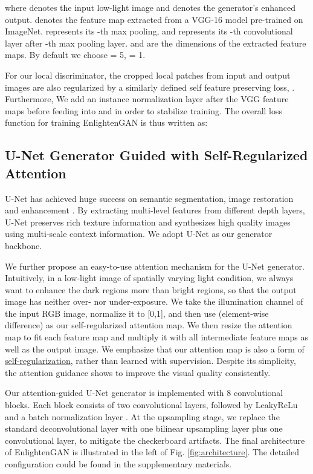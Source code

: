 \documentclass[journal]{IEEEtran}
\begin{document}
where  denotes the input low-light image and  denotes the generator's enhanced output.  denotes the feature map extracted from a VGG-16 model pre-trained on ImageNet.  represents its -th max pooling, and  represents its -th convolutional layer after -th max pooling layer.  and  are the dimensions of the extracted feature maps. By default we choose  = 5,  = 1.

For our local discriminator, the cropped local patches from input and output images are also regularized by a similarly defined self feature preserving loss, . 
Furthermore, We add an instance normalization layer \cite{ulyanov2017improved} after the VGG feature maps before feeding into  and  in order to stabilize training. The overall loss function for training EnlightenGAN is thus written as:



\subsection{U-Net Generator Guided with Self-Regularized Attention}
U-Net \cite{ronneberger2015u} has achieved huge success on semantic segmentation, image restoration and enhancement \cite{liu2018image}. By extracting multi-level features from different depth layers, U-Net preserves rich texture information and synthesizes high quality images using multi-scale context information. We adopt U-Net as our generator backbone.

We further propose an easy-to-use attention mechanism for the U-Net generator. Intuitively, in a low-light image of spatially varying light condition, we always want to enhance the dark regions more than bright regions, so that the output image has neither over- nor under-exposure. 
We take the illumination channel  of the input RGB image, normalize it to [0,1], and then use  (element-wise difference) as our self-regularized attention map. 
We then resize the attention map to fit each feature map and multiply it with all intermediate feature maps as well as the output image. We emphasize that our attention map is also a form of \underline{self-regularization}, rather than learned with supervision. Despite its simplicity, the attention guidance shows to improve the visual quality consistently. 


Our attention-guided U-Net generator is implemented with 8 convolutional blocks. Each block consists of 
two  convolutional layers, followed by LeakyReLu and a batch normalization layer \cite{ioffe2015batch}. At the upsampling stage, we replace the standard deconvolutional layer with one bilinear upsampling layer plus one convolutional layer, to mitigate the checkerboard artifacts. The final architecture of EnlightenGAN is illustrated in the left of Fig. \ref{fig:architecture}. The detailed configuration could be found in the supplementary materials. 
\end{document}

